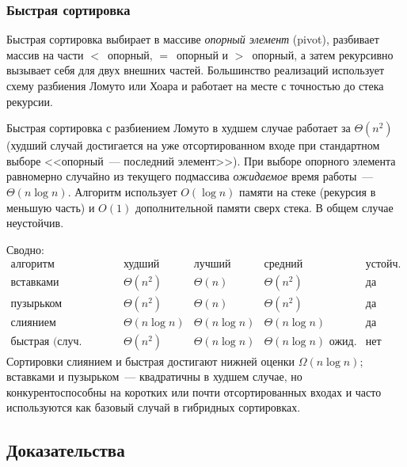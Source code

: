 \subsubsection*{Быстрая сортировка}

Быстрая сортировка выбирает в массиве \emph{опорный элемент} (pivot),
разбивает массив на части $< $~опорный, $=$~опорный и $>$~опорный, а
затем рекурсивно вызывает себя для двух внешних частей. Большинство
реализаций использует схему разбиения Ломуто или Хоара и работает на
месте с точностью до стека рекурсии.

\begin{proposition}
\label{prop:quicksort}
Быстрая сортировка с разбиением Ломуто в худшем случае работает за
$\Theta(n^2)$ (худший случай достигается на уже отсортированном входе
при стандартном выборе <<опорный~--- последний элемент>>). При выборе
опорного элемента равномерно случайно из текущего подмассива
\emph{ожидаемое} время работы~--- $\Theta(n \log n)$. Алгоритм
использует $O(\log n)$ памяти на стеке (рекурсия в меньшую часть) и
$O(1)$ дополнительной памяти сверх стека. В общем случае неустойчив.
\end{proposition}

\begin{remark}
Сводно:
\[
  \begin{array}{l|cccc}
    \text{алгоритм} & \text{худший} & \text{лучший} & \text{средний} & \text{устойч.} \\
    \hline
    \text{вставками}  & \Theta(n^2)   & \Theta(n)         & \Theta(n^2)        & \text{да} \\
    \text{пузырьком}  & \Theta(n^2)   & \Theta(n)         & \Theta(n^2)        & \text{да} \\
    \text{слиянием}   & \Theta(n \log n) & \Theta(n \log n) & \Theta(n \log n) & \text{да} \\
    \text{быстрая (случ. опорный)} & \Theta(n^2) & \Theta(n \log n) & \Theta(n \log n) \text{ ожид.} & \text{нет}
  \end{array}
\]
Сортировки слиянием и быстрая достигают нижней оценки
$\Omega(n \log n)$; вставками и пузырьком~--- квадратичны в худшем
случае, но конкурентоспособны на коротких или почти отсортированных
входах и часто используются как базовый случай в гибридных
сортировках.
\end{remark}

\subsection*{Доказательства}

